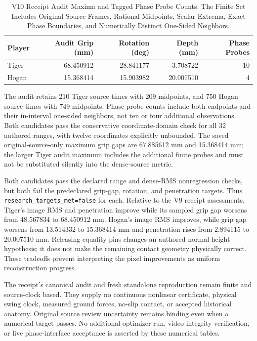 \documentclass[11pt,letterpaper]{article}
\newcommand{\code}[1]{\nolinkurl{#1}}
\begin{document}
\begin{table}[ht]\centering\small
\begin{tabular}{@{}lrrrr@{}}
\toprule Player & Audit Grip (mm) & Rotation (deg) & Depth (mm) & Phase Probes\\\midrule
Tiger & 68.450912 & 28.841177 & 3.708722 & 10\\
Hogan & 15.368414 & 15.903982 & 20.007510 & 4\\
\bottomrule
\end{tabular}
\caption{V10 Receipt Audit Maxima and Tagged Phase Probe Counts.
The Finite Set Includes Original Source Frames, Rational Midpoints, Scalar
Extrema, Exact Phase Boundaries, and Numerically Distinct One-Sided Neighbors.}
\end{table}
The audit retains 210 Tiger source times with 209 midpoints, and 750 Hogan
source times with 749 midpoints. Phase probe counts include both endpoints
and their in-interval one-sided neighbors, not ten or four additional
observations. Both candidates pass the conservative coordinate-domain check
for all 32 authored ranges, with twelve coordinates explicitly unbounded.
The saved original-source-only maximum grip gaps are 67.885612 mm and
15.368414 mm; the larger Tiger audit maximum includes the additional finite
probes and must not be substituted silently into the dense-source metric.

Both candidates pass the declared range and dense-RMS nonregression checks,
but both fail the predeclared grip-gap, rotation, and penetration targets.
Thus \code{research_targets_met=false} for each. Relative to the V9 receipt
assessments, Tiger's image RMS and penetration improve while its sampled grip
gap worsens from 48.567834 to 68.450912 mm. Hogan's image RMS improves, while
grip gap worsens from 13.514332 to 15.368414 mm and penetration rises from
2.894115 to 20.007510 mm. Releasing equality pins changes an authored normal
height hypothesis; it does not make the remaining contact geometry physically
correct. These tradeoffs prevent interpreting the pixel improvements as
uniform reconstruction progress.

The receipt's canonical audit and fresh standalone reproduction remain finite
and source-clock based. They supply no continuous
nonlinear certificate, physical swing clock, measured ground forces, no-slip
contact, or accepted historical anatomy. Original source review uncertainty
remains binding even when a numerical target passes. No additional optimizer
run, video-integrity verification, or live phase-interface acceptance is
asserted by these numerical tables.
\end{document}
